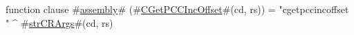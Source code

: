 function clause #\hyperref[sailMIPSzassembly]{assembly}# (#\hyperref[sailMIPSzCGetPCCIncOffset]{CGetPCCIncOffset}#(cd, rs)) = "cgetpccincoffset " ^ #\hyperref[sailMIPSzstrCRArgs]{strCRArgs}#(cd, rs)
